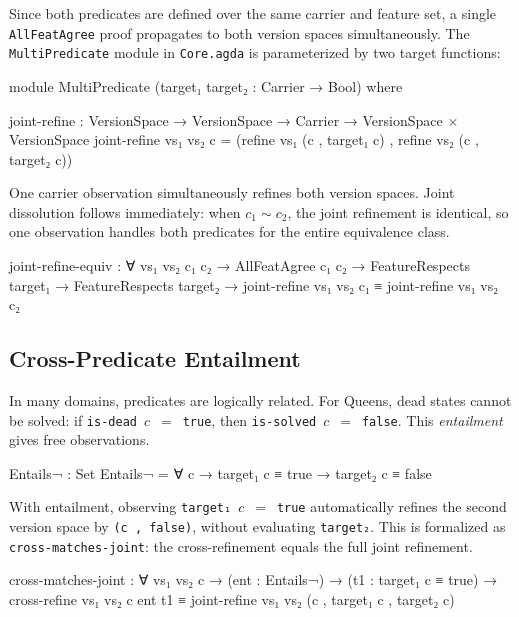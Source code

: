 \documentclass[9pt,a4paper]{article}
\theoremstyle{plain}
\theoremstyle{definition}
\theoremstyle{remark}
\begin{document}
Since both predicates are defined over the same carrier and feature set, a single \texttt{AllFeatAgree} proof propagates to both version spaces simultaneously.  The \texttt{MultiPredicate} module in \texttt{Core.agda} is parameterized by two target functions:

\begin{spec}
    module MultiPredicate
      (target₁ target₂ : Carrier → Bool) where

      joint-refine : VersionSpace → VersionSpace →
        Carrier → VersionSpace × VersionSpace
      joint-refine vs₁ vs₂ c =
        (refine vs₁ (c , target₁ c) ,
         refine vs₂ (c , target₂ c))
\end{spec}

\noindent One carrier observation simultaneously refines both version spaces.  Joint dissolution follows immediately: when $c_1 \sim c_2$, the joint refinement is identical, so one observation handles both predicates for the entire equivalence class.

\begin{spec}
      joint-refine-equiv : ∀ vs₁ vs₂ c₁ c₂ →
        AllFeatAgree c₁ c₂ →
        FeatureRespects target₁ →
        FeatureRespects target₂ →
        joint-refine vs₁ vs₂ c₁
          ≡ joint-refine vs₁ vs₂ c₂
\end{spec}

\subsection{Cross-Predicate Entailment}

In many domains, predicates are logically related.  For Queens, dead states cannot be solved: if \texttt{is-dead}~$c$~$=$~\texttt{true}, then \texttt{is-solved}~$c$~$=$~\texttt{false}.  This \emph{entailment} gives free observations.

\begin{spec}
      Entails¬ : Set
      Entails¬ = ∀ c → target₁ c ≡ true →
                        target₂ c ≡ false
\end{spec}

\noindent With entailment, observing \texttt{target₁}~$c$~$=$~\texttt{true} automatically refines the second version space by \texttt{(c , false)}, without evaluating \texttt{target₂}.  This is formalized as \texttt{cross-matches-joint}: the cross-refinement equals the full joint refinement.

\begin{spec}
      cross-matches-joint : ∀ vs₁ vs₂ c →
        (ent : Entails¬) →
        (t1 : target₁ c ≡ true) →
        cross-refine vs₁ vs₂ c ent t1
          ≡ joint-refine vs₁ vs₂
              (c , target₁ c , target₂ c)
\end{spec}
\end{document}
